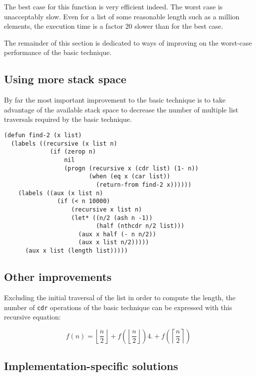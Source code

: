 The best case for this function is very efficient indeed.%
The worst case is unacceptably slow.  Even for a list of some
reasonable length such as a million elements, the execution time is a
factor $20$ slower than for the best case.

The remainder of this section is dedicated to ways of improving on the
worst-case performance of the basic technique.

\subsection{Using more stack space}

By far the most important improvement to the basic technique is to
take advantage of the available stack space to decrease the number of
multiple list traversals required by the basic technique.

{\small\begin{verbatim}
(defun find-2 (x list)
  (labels ((recursive (x list n)
             (if (zerop n)
                 nil
                 (progn (recursive x (cdr list) (1- n))
                        (when (eq x (car list))
                          (return-from find-2 x))))))
    (labels ((aux (x list n)
               (if (< n 10000)
                   (recursive x list n)
                   (let* ((n/2 (ash n -1))
                          (half (nthcdr n/2 list)))
                     (aux x half (- n n/2))
                     (aux x list n/2)))))
      (aux x list (length list)))))
\end{verbatim}}

\subsection{Other improvements}

Excluding the initial traversal of the list in order to compute the
length, the number of \texttt{cdr} operations of the basic technique
can be expressed with this recursive equation:%

$$f(n) = \left\lfloor\frac{n}{2}\right\rfloor
+ f(\left\lfloor\frac{n}{2}\right\rfloor)4.
+ f(\left\lceil\frac{n}{2}\right\rceil)$$

\subsection{Implementation-specific solutions}

